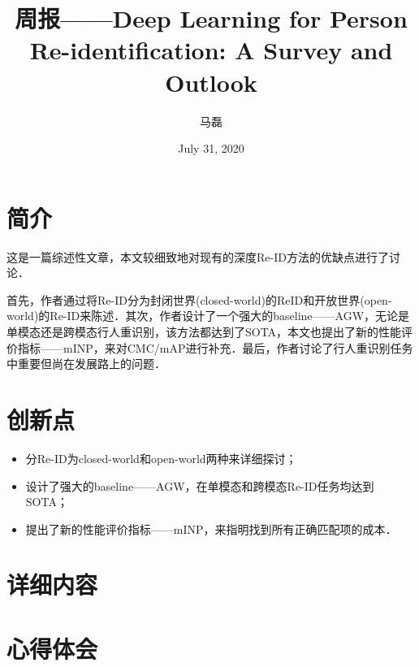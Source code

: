 \documentclass{article}  %
\title{周报——Deep Learning for Person Re-identification:
A Survey and Outlook}
\author{马磊 }
\date{July 31, 2020}
\begin{document}
\maketitle %
\section{简介}
这是一篇综述性文章，本文较细致地对现有的深度Re-ID方法的优缺点进行了讨论．\par
首先，作者通过将Re-ID分为封闭世界(closed-world)的ReID和开放世界(open-world)的Re-ID来陈述．其次，作者设计了一个强大的baseline——AGW，无论是单模态还是跨模态行人重识别，该方法都达到了SOTA，本文也提出了新的性能评价指标——mINP，来对CMC/mAP进行补充．最后，作者讨论了行人重识别任务中重要但尚在发展路上的问题．
\section{创新点}
\begin{itemize}
    \item 分Re-ID为closed-world和open-world两种来详细探讨；
    \item 设计了强大的baseline——AGW，在单模态和跨模态Re-ID任务均达到SOTA；
    \item 提出了新的性能评价指标——mINP，来指明找到所有正确匹配项的成本．
\end{itemize}
\section{详细内容}
\section{心得体会}
\end{document}
